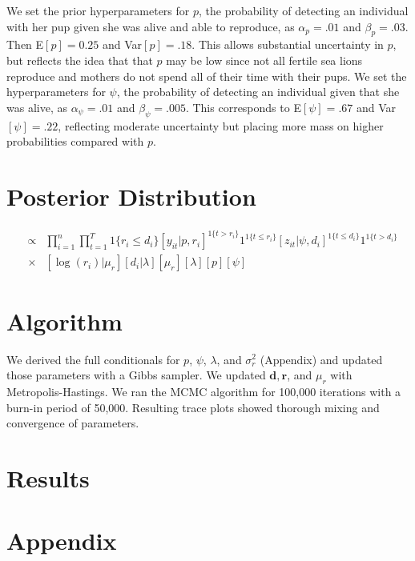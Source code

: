 \documentclass[12pt, a4paper]{article}
\begin{document}
We set the prior hyperparameters for $p$, the probability of detecting an individual with her pup given she was alive and able to reproduce, as $\alpha_p = .01$ and $\beta_p = .03$. Then E$[p] = 0.25$ and Var$[p] = .18$. This allows substantial uncertainty in $p$, but reflects the idea that that $p$ may be low since not all fertile sea lions reproduce and mothers do not spend all of their time with their pups. We set the hyperparameters for $\psi$, the probability of detecting an individual given that she was alive, as $\alpha_{\psi} = .01$ and $\beta_{\psi} = .005$. This corresponds to E$[\psi] = .67$ and Var$[\psi] = .22$, reflecting moderate uncertainty but placing more mass on higher probabilities compared with $p$. 

\section{Posterior Distribution}

\begin{eqnarray*}
[\log (\mathbf{r}), \mu_r, p, \mathbf{d}, \lambda, \psi | \mathbf{z}, \mathbf{y} ] & \propto & \prod_{i=1}^n \prod_{t=1} ^T  1\{r_i \leq d_i \} [y_{it}|p,r_i]^{1\{ t > r_i \}} 1^{1\{ t \leq r_i \}} [z_{it}|\psi, d_i]^{1 \{ t \leq d_i\} } 1^{1 \{ t > d_i\}} \\
  & \times & [\log(r_i)|\mu_r][d_i|\lambda]  [\mu_r][\lambda][p][\psi]
\end{eqnarray*}


\section{Algorithm}

We derived the full conditionals for $p$, $\psi$, $\lambda$, and $\sigma_r^2$ (Appendix) and updated those parameters with a Gibbs sampler. We updated $\mathbf{d}, \mathbf{r}$, and $\mu_r$ with Metropolis-Hastings. We ran the MCMC algorithm for 100,000 iterations with a burn-in period of 50,000. Resulting trace plots showed thorough mixing and convergence of parameters. 

\section{Results}



\section{Appendix}
\end{document}
